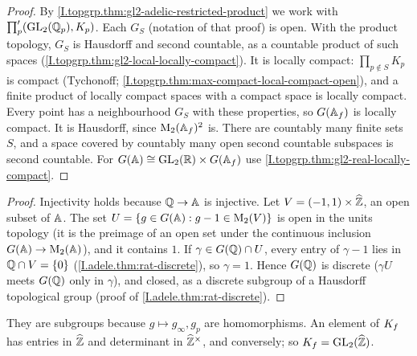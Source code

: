 \begin{theorem}
\end{theorem}
\begin{proof}
By \cref{I.topgrp.thm:gl2-adelic-restricted-product} we work with $\prod'_p(\mathrm{GL}_2(\mathbb{Q}_p),K_p)$. Each $G_S$ (notation of
that proof) is open. With the product topology, $G_S$ is Hausdorff and second countable, as a countable product of such
spaces (\cref{I.topgrp.thm:gl2-local-locally-compact}). It is locally compact: $\prod_{p\notin S}K_p$ is compact
(Tychonoff; \cref{I.topgrp.thm:max-compact-local-compact-open}), and a finite product of locally compact spaces with a
compact space is locally compact. Every point has a neighbourhood $G_S$ with these properties, so $G(\mathbb{A}_f)$ is locally
compact. It is Hausdorff, since $\mathrm{M}_2(\mathbb{A}_f)^2$ is. There are countably many finite sets $S$, and a space covered by
countably many open second countable subspaces is second countable. For $G(\mathbb{A})\cong\mathrm{GL}_2(\mathbb{R})\times G(\mathbb{A}_f)$ use
\cref{I.topgrp.thm:gl2-real-locally-compact}.
\end{proof}

\begin{theorem}[$G(\Q)$ is discrete]
\end{theorem}
\begin{proof}
Injectivity holds because $\mathbb{Q}\to\mathbb{A}$ is injective. Let $V=(-1,1)\times\widehat{\mathbb{Z}}$, an open subset of $\mathbb{A}$. The set
$U=\{g\in G(\mathbb{A}):g-1\in\mathrm{M}_2(V)\}$ is open in the units topology (it is the preimage of an open set under the
continuous inclusion $G(\mathbb{A})\to\mathrm{M}_2(\mathbb{A})$), and it contains $1$. If $\gamma\in G(\mathbb{Q})\cap U$, every entry of $\gamma-1$
lies in $\mathbb{Q}\cap V=\{0\}$ (\cref{I.adele.thm:rat-discrete}), so $\gamma=1$. Hence $G(\Q)$ is discrete ($\gamma U$ meets
$G(\Q)$ only in $\gamma$), and closed, as a discrete subgroup of a Hausdorff topological group (proof of
\cref{I.adele.thm:rat-discrete}).
\end{proof}

\begin{definition}
\end{definition}
\noindent They are subgroups because $g\mapsto g_\infty,g_p$ are homomorphisms. An element of $K_f$ has entries in $\widehat{\mathbb{Z}}$
and determinant in $\widehat{\mathbb{Z}}^\times$, and conversely; so $K_f=\mathrm{GL}_2(\widehat{\mathbb{Z}})$.

